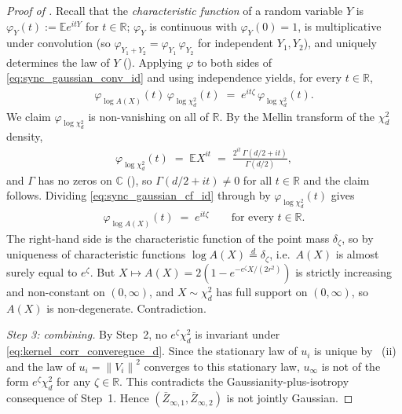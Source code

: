 \documentclass{article}
\newcommand{\RR}{\mathbb{R}}
\newcommand{\Exp}[1]{\mathbb{E} #1}
\newcommand{\norm}[1]{\left\|#1\right\|}
\newcommand{\bZ}{\bar{Z}}
\begin{document}
\begin{proof}[Proof of ]
  Recall that the \emph{characteristic function} of a random variable $Y$ is $\varphi_Y(t) := \Exp{e^{i t Y}}$ for $t \in \RR$; $\varphi_Y$ is continuous with $\varphi_Y(0) = 1$, is multiplicative under convolution (so $\varphi_{Y_1 + Y_2} = \varphi_{Y_1}\, \varphi_{Y_2}$ for independent $Y_1, Y_2$), and uniquely determines the law of $Y$ (\cite{durrett2019probability}). Applying $\varphi$ to both sides of \eqref{eq:sync_gaussian_conv_id} and using independence yields, for every $t \in \RR$,
  \begin{eqnarray}
    \label{eq:sync_gaussian_cf_id}
    \varphi_{\log A(X)}(t)\, \varphi_{\log \chi^2_d}(t) \;=\; e^{i t \zeta}\, \varphi_{\log \chi^2_d}(t).
  \end{eqnarray}
  We claim $\varphi_{\log \chi^2_d}$ is non-vanishing on all of $\RR$. By the Mellin transform of the $\chi^2_d$ density,
  \begin{eqnarray*}
    \varphi_{\log \chi^2_d}(t) \;=\; \Exp{X^{i t}} \;=\; \frac{2^{i t}\, \Gamma(d/2 + i t)}{\Gamma(d/2)},
  \end{eqnarray*}
  and $\Gamma$ has no zeros on $\mathbb{C}$ (\cite{abramowitz1964handbook}), so $\Gamma(d/2 + i t) \neq 0$ for all $t \in \RR$ and the claim follows. Dividing \eqref{eq:sync_gaussian_cf_id} through by $\varphi_{\log \chi^2_d}(t)$ gives
  \begin{eqnarray*}
    \varphi_{\log A(X)}(t) \;=\; e^{i t \zeta} \qquad \text{for every } t \in \RR.
  \end{eqnarray*}
  The right-hand side is the characteristic function of the point mass $\delta_{\zeta}$, so by uniqueness of characteristic functions $\log A(X) \stackrel{d}{=} \delta_\zeta$, i.e.\ $A(X)$ is almost surely equal to $e^\zeta$. But $X \mapsto A(X) = 2(1 - e^{-e^\zeta X / (2 r^2)})$ is strictly increasing and non-constant on $(0, \infty)$, and $X \sim \chi^2_d$ has full support on $(0, \infty)$, so $A(X)$ is non-degenerate. Contradiction.

  \emph{Step 3: combining.} By Step~2, no $e^\zeta \chi^2_d$ is invariant under \eqref{eq:kernel_corr_converegnce_d}. Since the stationary law of $u_i$ is unique by ~(ii) and the law of $u_i = \norm{V_i}^2$ converges to this stationary law, $u_\infty$ is not of the form $e^\zeta \chi^2_d$ for any $\zeta \in \RR$. This contradicts the Gaussianity-plus-isotropy consequence of Step~1. Hence $(\bZ_{\infty,1}, \bZ_{\infty,2})$ is not jointly Gaussian.
\end{proof}
\end{document}
